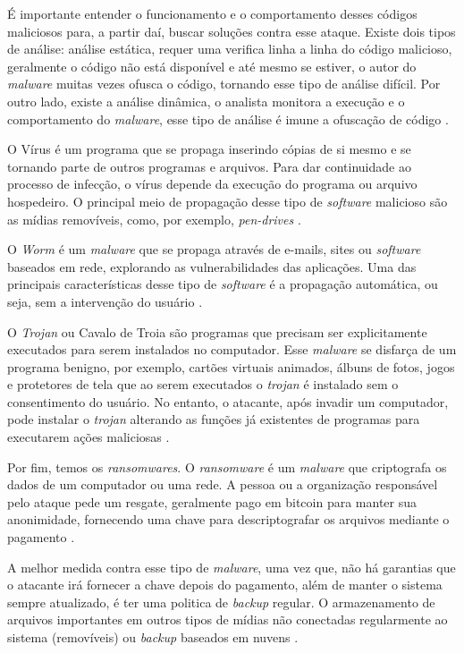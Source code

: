  É importante entender o funcionamento e o comportamento desses códigos maliciosos para, a partir daí, buscar soluções contra esse ataque. Existe dois tipos de análise: análise estática, requer uma verifica linha a linha do código malicioso, geralmente o código não está disponível e até mesmo se estiver, o autor do \textit{malware} muitas vezes ofusca o código, tornando esse tipo de análise difícil. Por outro lado, existe a análise dinâmica, o analista monitora a execução e o comportamento do \textit{malware}, esse tipo de análise é imune a ofuscação de código \cite{encycrypt}.

 O Vírus é um programa que se propaga inserindo cópias de si mesmo e se tornando parte de outros programas e arquivos. Para dar continuidade ao processo de infecção, o vírus depende da execução do programa ou arquivo hospedeiro. O principal meio de propagação desse tipo de \textit{software} malicioso são as mídias removíveis, como, por exemplo, \textit{pen-drives} \cite{certs-malwares}.

 O \textit{Worm} é um \textit{malware} que se propaga através de e-mails, sites ou \textit{software} baseados em rede, explorando as vulnerabilidades das aplicações. Uma das principais características desse tipo de \textit{software} é a propagação automática, ou seja, sem a intervenção do usuário \cite{detectingworm}. 

 O \textit{Trojan} ou Cavalo de Troia são programas que precisam ser explicitamente executados para serem instalados no computador. Esse \textit{malware} se disfarça de um programa benigno, por exemplo, cartões virtuais animados, álbuns de fotos, jogos e protetores de tela que ao serem executados o \textit{trojan} é instalado sem o consentimento do usuário. No entanto, o atacante, após invadir um computador, pode instalar o \textit{trojan} alterando as funções já existentes de programas para executarem ações maliciosas \cite{certs-malwares}.

 Por fim, temos os \textit{ransomwares}. O \textit{ransomware} é um \textit{malware} que criptografa os dados de um computador ou uma rede. A pessoa ou a organização responsável pelo ataque pede um resgate, geralmente pago em bitcoin para manter sua anonimidade, fornecendo uma chave para descriptografar os arquivos mediante o pagamento \cite{ransomware:matt}.

 A melhor medida contra esse tipo de \textit{malware}, uma vez que, não há garantias que o atacante irá fornecer a chave depois do pagamento, além de manter o sistema sempre atualizado, é ter uma politica de \textit{backup} regular. O armazenamento de arquivos importantes em outros tipos de mídias não conectadas regularmente ao sistema (removíveis) ou \textit{backup} baseados em nuvens \cite{ransomware:matt}.

